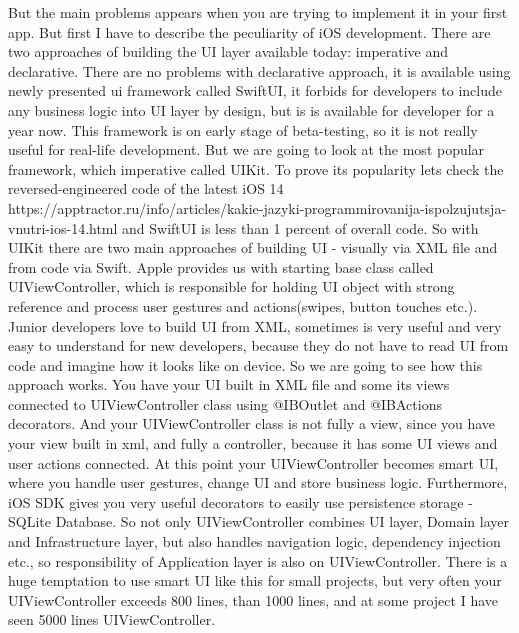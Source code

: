 But the main problems appears when you are trying to implement it in your first app. But first I have to describe the peculiarity of iOS development. There are two approaches of building the UI layer available today: imperative and declarative. There are no problems with declarative approach, it is available using newly presented ui framework called SwiftUI, it forbids for developers to include any business logic into UI layer by design, but is is available for developer for a year now. This framework is on early stage of beta-testing, so it is not really useful for real-life development. But we are going to look at the most popular framework, which imperative called UIKit. To prove its popularity lets check the reversed-engineered code of the latest iOS 14 https://apptractor.ru/info/articles/kakie-jazyki-programmirovanija-ispolzujutsja-vnutri-ios-14.html and SwiftUI is less than 1 percent of overall code. So with UIKit there are two main approaches of building UI - visually via XML file and from code via Swift. Apple provides us with starting base class called UIViewController, which is responsible for holding UI object with strong reference and process user gestures and actions(swipes, button touches etc.). Junior developers love to build UI from XML, sometimes is very useful and very easy to understand for new developers, because they do not have to read UI from code and imagine how it looks like on device.  So we are going to see how this approach works. You have your UI built in XML file and some its views connected to UIViewController class using @IBOutlet and @IBActions decorators. And your UIViewController class is not fully a view, since you have your view built in xml, and fully a controller, because it has some UI views and user actions connected. At this point your UIViewController becomes smart UI, where you handle user gestures, change UI and store business logic. Furthermore, iOS SDK gives you very useful decorators to easily use persistence storage - SQLite Database. So not only UIViewController combines UI layer, Domain layer and Infrastructure layer, but also handles navigation logic, dependency injection etc., so responsibility of Application layer is also on UIViewController. There is a huge temptation to use smart UI like this for small projects, but very often your UIViewController exceeds 800 lines, than 1000 lines, and at some project I have seen 5000 lines UIViewController. 

